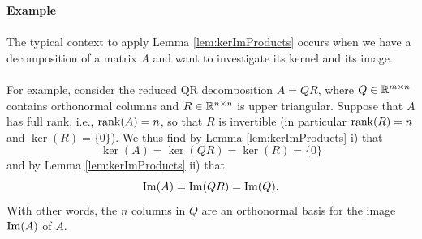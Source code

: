 \begin{frame}
\textbf{Example}
~\\~\\
	The typical context to apply Lemma \ref{lem:kerImProducts} occurs when we have a decomposition of a matrix $A$ and want to investigate its kernel and its image.
	~\\~\\
	 For example, consider the reduced QR decomposition $A = QR$, where $Q \in {\mathbb{R}}^{m\times n}$ contains orthonormal columns and $R \in {\mathbb{R}}^{n\times n}$ is upper triangular. Suppose that $A$ has full rank, i.e., $\operatorname{rank}(A)= n$, so that $R$ is invertible (in particular $\operatorname{rank}(R)=n$ and $\ker(R)=\{0\}$). We thus find by Lemma \ref{lem:kerImProducts} i) that
	$$\ker(A) = \ker(QR) = \ker(R) = \{0\} $$
	and by Lemma \ref{lem:kerImProducts} ii) that
	$$\operatorname{Im}(A) = \operatorname{Im}(QR)= \operatorname{Im}(Q).$$
	With other words, the $n$ columns in $Q$ are an orthonormal basis for the image $\operatorname{Im}(A)$ of $A$.
\end{frame}



